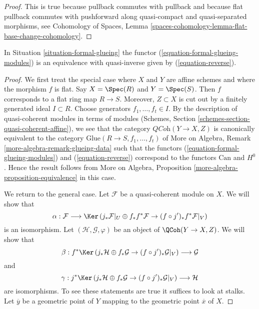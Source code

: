 \begin{proof}
This is true because pullback commutes with pullback and because
flat pullback commutes with pushforward along quasi-compact
and quasi-separated morphisms, see
Cohomology of Spaces, Lemma
\ref{spaces-cohomology-lemma-flat-base-change-cohomology}.
\end{proof}

\begin{proposition}
\label{proposition-formal-glueing-modules}
In Situation \ref{situation-formal-glueing} the functor
(\ref{equation-formal-glueing-modules}) is an equivalence
with quasi-inverse given by (\ref{equation-reverse}).
\end{proposition}

\begin{proof}
We first treat the special case where $X$ and $Y$ are affine schemes
and where the morphism $f$ is flat. Say $X = \Spec(R)$ and $Y = \Spec(S)$.
Then $f$ corresponds to a flat ring map $R \to S$. Moreover, $Z \subset X$
is cut out by a finitely generated ideal $I \subset R$. Choose generators
$f_1, \ldots, f_t \in I$. By the description of quasi-coherent modules
in terms of modules
(Schemes, Section \ref{schemes-section-quasi-coherent-affine}),
we see that the category $\textit{QCoh}(Y \to X, Z)$
is canonically equivalent to the category
$\text{Glue}(R \to S, f_1, \ldots, f_t)$
of More on Algebra, Remark \ref{more-algebra-remark-glueing-data}
such that the functors
(\ref{equation-formal-glueing-modules}) and (\ref{equation-reverse})
correspond to the functors $\text{Can}$ and $H^0$.
Hence the result follows from
More on Algebra, Proposition \ref{more-algebra-proposition-equivalence}
in this case.

\medskip\noindent
We return to the general case.
Let $\mathcal{F}$ be a quasi-coherent module on $X$.
We will show that
$$
\alpha :
\mathcal{F}
\longrightarrow
\Ker\left(j_*\mathcal{F}|_U \oplus f_*f^*\mathcal{F} \to
(f \circ j')_*f^*\mathcal{F}|_V\right)
$$
is an isomorphism. Let $(\mathcal{H}, \mathcal{G}, \varphi)$
be an object of $\QCoh(Y \to X, Z)$. We will show that
$$
\beta :
f^*\Ker\left(
j_*\mathcal{H} \oplus f_*\mathcal{G} \to (f \circ j')_*\mathcal{G}|_V
\right)
\longrightarrow
\mathcal{G}
$$
and
$$
\gamma :
j^*\Ker\left(
j_*\mathcal{H} \oplus f_*\mathcal{G} \to (f \circ j')_*\mathcal{G}|_V
\right)
\longrightarrow
\mathcal{H}
$$
are isomorphisms. To see these statements are true it suffices to
look at stalks. Let $\overline{y}$ be a geometric point of $Y$ mapping
to the geometric point $\overline{x}$ of $X$.


\end{proof}
